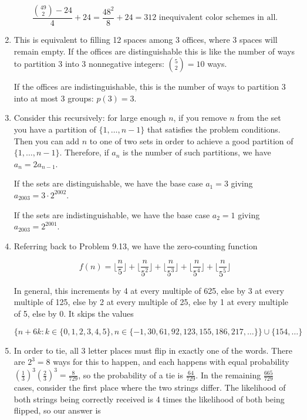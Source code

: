 \documentclass{book}
\numberwithin{equation}{section}
\begin{document}
\begin{enumerate}[label={9.\arabic*}]
$$\frac{{49 \choose 2} - 24}{4} + 24 = \frac{48^2}{8} + 24 = 312 \text{ inequivalent color schemes in all.}$$

\item
This is equivalent to filling 12 spaces among 3 offices, where 3 spaces will remain empty. If the offices are
distinguishable this is like the number of ways to partition 3 into 3 nonnegative integers: ${5 \choose 2} = 10$ ways.

If the offices are indistinguishable, this is the number of ways to partition 3 into at most 3 groups: $p(3) = 3$.

\item
Consider this recursively: for large enough $n$, if you remove $n$ from the set you have a partition of $\{1, \ldots, n-1\}$
that satisfies the problem conditions. Then you can add $n$ to one of two sets in order to achieve a good partition of
$\{1, \ldots, n-1\}$. Therefore, if $a_n$ is the number of such partitions, we have $a_n = 2a_{n-1}$.

If the sets are distinguishable, we have the base case $a_1 = 3$ giving $a_{2003} = 3\cdot2^{2002}$.

If the sets are indistinguishable, we have the base case $a_2 = 1$ giving $a_{2003} = 2^{2001}$.

\item
Referring back to Problem 9.13, we have the zero-counting function

$$f(n) = \lfloor \frac{n}{5} \rfloor + \lfloor \frac{n}{5^2} \rfloor + \lfloor \frac{n}{5^3} \rfloor + \lfloor \frac{n}{5^4} \rfloor + \lfloor \frac{n}{5^5} \rfloor$$

In general, this increments by 4 at every multiple of 625, else by 3 at every multiple of 125, else by 2 at
every multiple of 25, else by 1 at every multiple of 5, else by 0. It skips the values

$$\{n + 6k : k \in \{0, 1, 2, 3, 4, 5\}, n \in \{-1, 30, 61, 92, 123, 155, 186, 217,\ldots \}\} \cup \{154, \ldots\}$$

\item
In order to tie, all 3 letter places must flip in exactly one of the words. There are $2^3 = 8$ ways for this to happen,
and each happens with equal probability $(\frac{1}{3})^3 (\frac{2}{3})^3 = \frac{8}{729}$, so the probability of
a tie is $\frac{64}{729}$. In the remaining $\frac{665}{729}$ cases, consider the first place where the two strings
differ. The likelihood of both strings being correctly received is 4 times the likelihood of both being flipped, so our
answer is


\end{enumerate}
\end{document}
